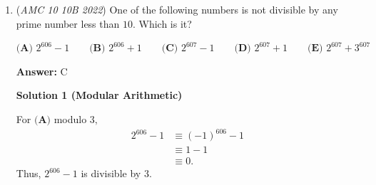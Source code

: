 \begin{enumerate}
 
I found the same solution when solving this, but essentially, we know all triangles in the picture are similar, and we know the lower left hand triangle is a $3-4-5$ triangle, and it is similar to the top triangle, where 4 corresponds to 5, therefore the unknown side length of that triangle is 15/4. Continuing on, the are of the white part of the square is $5 * 15/4 * 1/2 = 75/8,  25 - 75/8 = \fbox{(D)}$

 
-kaiser

 



\textbf{Solution 6 (Fastest Similar Triangles)}

For reference, use the points labelled in the diagram of Solution 3. Let the point one unit to the right of $A$ be $A'$ (so that $A'$ is one of the vertices of the square). The square means $A'C = 5$, so we get a $3$-$4$-$5$ triangle $A'BC$.

 $m\angle BA'C = 90 ^{\circ} - m\angle CA'G = m\angle GA'H$. 

 Therefore $\triangle GA'H$ is proportional to a $3$-$4$-$5$ triangle, with $HG$ corresponding to $3$ and $A'H$ corresponding to $4$. By similar triangles, we find 

 $HG = A'H \cdot \frac{3}{4} = \frac{15}{4}$.

 
            \begin{enumerate}[label=(\roman*)]
                <dt>then, finally, $[A'CEG] = [A'CEH] - [\triangle GA'H] = 5^2 - \frac{1}{2} \cdot \frac{15}{4} \cdot 5 = \boxed{\textbf{(D) }15\dfrac{5}{8}}.$</dt>
            \end{enumerate}
            


	\item (\textit{AMC 10 10B 2022}) One of the following numbers is not divisible by any prime number less than $10.$ Which is it?


 $\textbf{(A) } 2^{606}-1 \qquad\textbf{(B) } 2^{606}+1 \qquad\textbf{(C) } 2^{607}-1 \qquad\textbf{(D) } 2^{607}+1\qquad\textbf{(E) } 2^{607}+3^{607}$

 \textbf{Answer: }C



\textbf{Solution 1 (Modular Arithmetic)}

For $\textbf{(A)}$ modulo $3,$
 \begin{align*} 2^{606} - 1 & \equiv (-1)^{606} - 1 \\ & \equiv 1 - 1 \\ & \equiv 0 . \end{align*}
Thus, $2^{606} - 1$ is divisible by $3.$


\end{enumerate}
